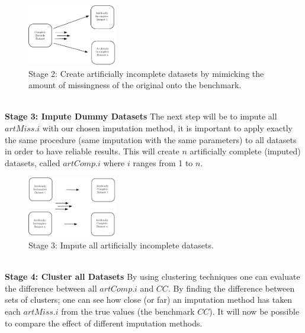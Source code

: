 \documentclass[conference,compsoc]{IEEEtran}
\begin{document}
	\begin{figure}[!ht]
		\caption{Stage 2: Create artificially incomplete datasets by mimicking the amount of missingness of the original onto the benchmark.}
		\centering
		\includegraphics[width=0.35\textwidth]{stage22.pdf}
	\end{figure}
	\\
	\indent \textbf{Stage 3: Impute Dummy Datasets}
	The next step will be to impute all $artMiss.i$ with our chosen imputation method, it is important to apply exactly the same procedure (same imputation with the same parameters) to all datasets in order to have reliable results. This will create $n$ artificially complete (imputed) datasets, called $artComp.i$ where $i$ ranges from 1 to $n$. 
	\begin{figure}[!ht]
		\caption{Stage 3: Impute all artificially incomplete datasets.}
		\centering
		\includegraphics[width=0.35\textwidth]{stage3-2.pdf}
	\end{figure}
	\\
	\indent \textbf{Stage 4: Cluster all Datasets}
	By using clustering techniques one can evaluate the difference between all $artComp.i$ and $CC$. By finding the difference between sets of clusters; one can see how close (or far) an imputation method has taken each $artMiss.i$ from the true values (the benchmark $CC$). It will now be possible to compare the effect of different imputation methods.
\end{document}
